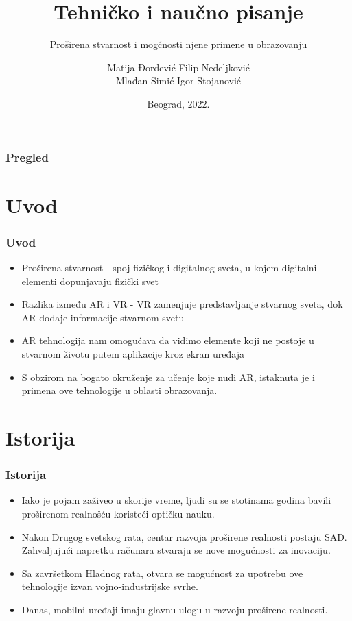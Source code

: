 \documentclass[9pt]{beamer}
\title{Tehničko i naučno pisanje}
\subtitle{Proširena stvarnost i mogćnosti njene primene u obrazovanju}
\author{Matija Đorđević  Filip Nedeljković\\
Mlađan Simić  Igor Stojanović}
\institute{Matematički fakultet\\Univerzitet u Beogradu}
\date{
	\footnotesize{Beograd, 2022.}	
}
\begin{document}
\begin{frame}
	\thispagestyle{empty}
	\titlepage
\end{frame}

\addtocounter{framenumber}{-1}







\begin{frame}
	\frametitle{Pregled} %
	\tableofcontents[hidesubsections] 
\end{frame}

\section{Uvod}

\begin{frame}[fragile]\frametitle{Uvod}
	\begin{itemize}	
 \setlength\itemsep{1.5em}
		\item Proširena stvarnost - spoj fizičkog i digitalnog sveta, u kojem digitalni elementi dopunjavaju fizički svet
		\item Razlika između AR i VR - VR zamenjuje predstavljanje stvarnog sveta, dok AR dodaje informacije stvarnom svetu
		\item AR tehnologija nam omogućava da vidimo elemente koji ne postoje u stvarnom životu putem aplikacije kroz ekran uređaja
		\item S obzirom na bogato okruženje za učenje koje nudi AR, istaknuta je i primena ove tehnologije u oblasti obrazovanja.
	
	\end{itemize}
\end{frame}


\section{Istorija}
	\begin{frame}
    \frametitle{Istorija}
        \begin{itemize}
            \setlength\itemsep{1.5em}
            \item Iako je pojam zaživeo u skorije vreme, ljudi su se stotinama godina bavili proširenom realnošću koristeći optičku nauku.
            \item Nakon Drugog svetskog rata, centar razvoja proširene realnosti postaju SAD. Zahvaljujući napretku računara stvaraju se nove mogućnosti za inovaciju.
            \item Sa završetkom Hladnog rata, otvara se mogućnost za upotrebu ove tehnologije izvan vojno-industrijske svrhe.
            \item Danas, mobilni uređaji imaju glavnu ulogu u razvoju proširene realnosti.
		\end{itemize}
	\end{frame}
	
\end{document}
